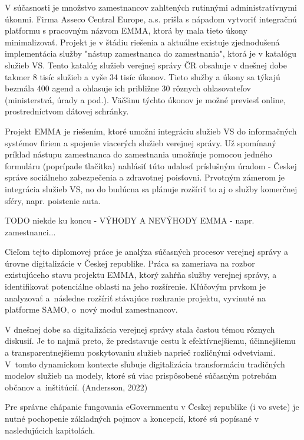 \startthesis
\startbodymatter

V súčasnosti je množstvo zamestnancov zahltených rutinnými administratívnymi úkonmi. Firma Asseco Central Europe, a.s. prišla s nápadom vytvoriť integračnú platformu s pracovným názvom EMMA, ktorá by mala tieto úkony minimalizovať. Projekt je v štádiu riešenia a aktuálne existuje zjednodušená implementácia služby "nástup zamestnanca do zamestnania", ktorá je v katalógu služieb VS. Tento katalóg služieb verejnej správy ČR obsahuje v dnešnej dobe takmer 8 tisíc služieb a vyše 34 tisíc úkonov.  Tieto služby a úkony sa týkajú bezmála 400 agend a ohlasuje ich približne 30 rôznych ohlasovateľov (ministerstvá, úrady a pod.). Väčšinu týchto úkonov je možné previesť online, prostredníctvom dátovej schránky. 

Projekt EMMA je riešením, ktoré umožni integráciu služieb VS do informačných systémov firiem a spojenie viacerých služieb verejnej správy. Už spomínaný príklad nástupu zamestnanca do zamestnania umožňuje pomocou jedného formuláru (poprípade tlačítka) nahlásiť túto udalosť príslušným úradom - Českej správe sociálneho zabezpečenia a zdravotnej poisťovni. Prvotným zámerom je integrácia služieb VS, no do budúcna sa plánuje rozšíriť to aj o služby komerčnej sféry, napr. poistenie auta. 

\TODO
TODO niekde ku koncu - VÝHODY A NEVÝHODY EMMA - napr. zamestnanci...

Cieľom tejto diplomovej práce je analýza súčasných procesov verejnej správy a úrovne digitalizácie v Českej republike. Práca sa zameriava na rozbor existujúceho stavu projektu EMMA, ktorý zahŕňa služby verejnej správy, a identifikovať potenciálne oblasti na jeho rozšírenie. Kľúčovým prvkom je analyzovať a~následne rozšíriť stávajúce rozhranie projektu, vyvinuté na platforme SAMO, o~nový modul zamestnancov. 

V dnešnej dobe sa digitalizácia verejnej správy stala častou témou rôznych diskusií. Je to najmä preto, že predstavuje cestu k efektívnejšiemu, účinnejšiemu a transparentnejšiemu poskytovaniu služieb naprieč rozličnými odvetviami. \zlom V~tomto dynamickom kontexte sľubuje digitalizácia transformáciu tradičných modelov služieb na modely, ktoré sú viac prispôsobené súčasným potrebám občanov a~inštitúcií. \scr(Andersson, 2022)

Pre správne chápanie fungovania eGovernmentu v Českej republike (i vo svete) je nutné pochopenie základných pojmov a koncepcií, ktoré sú popísané v nasledujúcich kapitolách.

